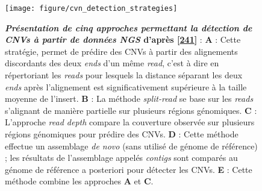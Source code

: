 \documentclass[12pt,a4paper,twoside]{ugathesis}
\theoremstyle{definition}
\theoremstyle{definition}
\theoremstyle{definition}
\theoremstyle{remark}
\begin{document}
\begin{figure}

{\centering \texttt{[image: figure/cvn\_detection\_strategies]} 

}

\caption[Présentation de cinq approches permettant la détection de CNVs à partir de données NGS]{\textbf{\emph{Présentation de cinq approches
permettant la détection de CNVs à partir de données NGS} d'après
{[}\protect\hyperlink{ref-Zhao2013}{241}{]}} : \textbf{A} : Cette
stratégie, permet de prédire des CNVs à partir des alignements
discordants des deux \emph{ends} d'un même \emph{read}, c'est à dire en
répertoriant les \emph{reads} pour lesquels la distance séparant les
deux \emph{ends} après l'alignement est significativement supérieure à
la taille moyenne de l'insert. \textbf{B} : La méthode \emph{split-read}
se base sur les \emph{reads} s'alignant de manière partielle sur
plusieurs régions génomiques. \textbf{C} : L'approche \emph{read depth}
compare la couverture observée sur plusieurs régions génomiques pour
prédire des CNVs. \textbf{D} : Cette méthode effectue un assemblage
\emph{de novo} (sans utilisé de génome de référence) ; les résultats de
l'assemblage appelés \emph{contigs} sont comparés au génome de référence
a posteriori pour détecter les CNVs. \textbf{E} : Cette méthode combine
les approches \textbf{A} et \textbf{C}.}\label{fig:pictcnvdetection}
\end{figure}


















\newpage
\end{document}

